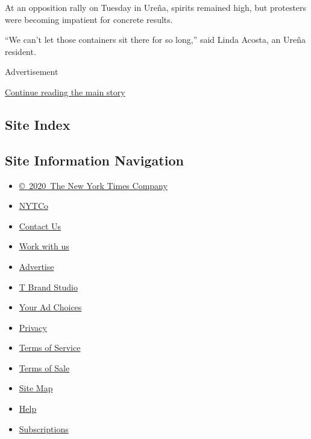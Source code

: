 At an opposition rally on Tuesday in Ureña, spirits remained high, but
protesters were becoming impatient for concrete results.

``We can't let those containers sit there for so long,'' said Linda
Acosta, an Ureña resident.

Advertisement

\protect\hyperlink{after-bottom}{Continue reading the main story}

\hypertarget{site-index}{%
\subsection{Site Index}\label{site-index}}

\hypertarget{site-information-navigation}{%
\subsection{Site Information
Navigation}\label{site-information-navigation}}

\begin{itemize}
\tightlist
\item
  \href{https://help.nytimes3xbfgragh.onion/hc/en-us/articles/115014792127-Copyright-notice}{©~2020~The
  New York Times Company}
\end{itemize}

\begin{itemize}
\tightlist
\item
  \href{https://www.nytco.com/}{NYTCo}
\item
  \href{https://help.nytimes3xbfgragh.onion/hc/en-us/articles/115015385887-Contact-Us}{Contact
  Us}
\item
  \href{https://www.nytco.com/careers/}{Work with us}
\item
  \href{https://nytmediakit.com/}{Advertise}
\item
  \href{http://www.tbrandstudio.com/}{T Brand Studio}
\item
  \href{https://www.nytimes3xbfgragh.onion/privacy/cookie-policy\#how-do-i-manage-trackers}{Your
  Ad Choices}
\item
  \href{https://www.nytimes3xbfgragh.onion/privacy}{Privacy}
\item
  \href{https://help.nytimes3xbfgragh.onion/hc/en-us/articles/115014893428-Terms-of-service}{Terms
  of Service}
\item
  \href{https://help.nytimes3xbfgragh.onion/hc/en-us/articles/115014893968-Terms-of-sale}{Terms
  of Sale}
\item
  \href{https://spiderbites.nytimes3xbfgragh.onion}{Site Map}
\item
  \href{https://help.nytimes3xbfgragh.onion/hc/en-us}{Help}
\item
  \href{https://www.nytimes3xbfgragh.onion/subscription?campaignId=37WXW}{Subscriptions}
\end{itemize}
